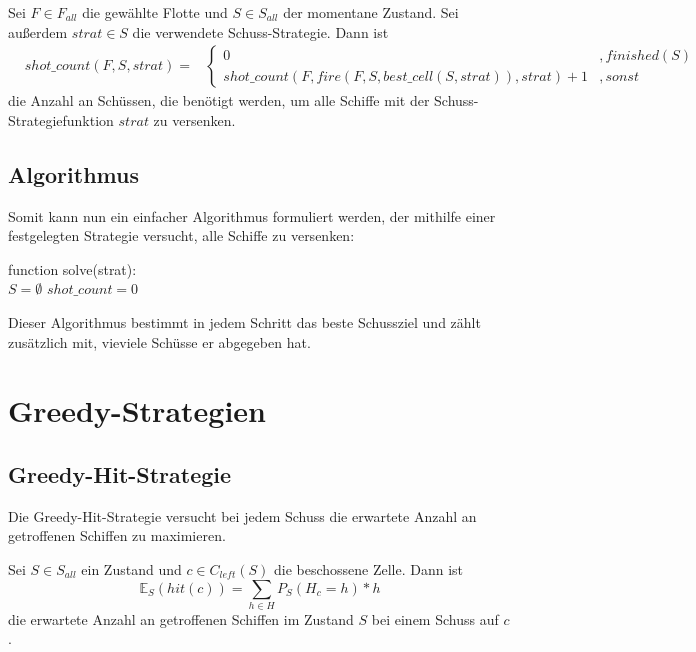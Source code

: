 \documentclass[a4paper,12pt]{llncs}
\numberwithin{equation}{section}
\begin{document}
\begin{definition}
Sei $F\in F_{all}$ die gewählte Flotte und $S\in S_{all}$ der momentane Zustand.
Sei außerdem $strat \in S$ die verwendete Schuss-Strategie.
Dann ist
\begin{align}
&shot\_count(F, S, strat)=
& \begin{cases} 
  	0& ,finished(S) \\
      shot\_count(F, fire(F, S, best\_cell(S, strat)), strat) + 1 & ,sonst
   \end{cases}
\nonumber
\end{align}
die Anzahl an Schüssen, die benötigt werden, um alle Schiffe mit der Schuss-Strategiefunktion $strat$ zu versenken.
\end{definition}

\subsection{Algorithmus}

Somit kann nun ein einfacher Algorithmus formuliert werden, der mithilfe einer festgelegten Strategie versucht, alle Schiffe zu versenken:

\begin{algorithm}[H]
 function solve(strat):\\
 $S=\emptyset$\;
 $shot\_count=0$\;
\end{algorithm}

Dieser Algorithmus bestimmt in jedem Schritt das beste Schussziel und zählt zusätzlich mit, vieviele Schüsse er abgegeben hat.

\section{Greedy-Strategien}

\subsection{Greedy-Hit-Strategie}
Die Greedy-Hit-Strategie versucht bei jedem Schuss die erwartete Anzahl an getroffenen Schiffen zu maximieren.

\begin{definition}
Sei $S\in S_{all}$ ein Zustand und $c \in C_{left}(S)$ die beschossene Zelle.
Dann ist
\[
\mathds{E}_S(hit(c))=\sum_{h \in H} P_S(H_{c}=h) * h
\]
die erwartete Anzahl an getroffenen Schiffen im Zustand $S$ bei einem Schuss auf $c$.
\end{definition}
\end{document}
